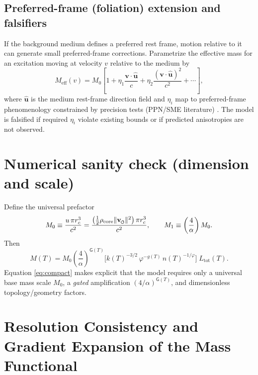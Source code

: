\documentclass[11pt]{article}
\newcommand{\vnorm}{\lVert \mathbf{v}_{\mkern-2mu\scriptscriptstyle\boldsymbol{\circlearrowleft}} \rVert}  %
\newcommand{\rc}{r_c}                                    %
\newcommand{\phig}{\varphi}
\newcommand{\alphafs}{\alpha}
\newcommand{\rhocore}{\rho_{\mathrm{core}}}
\newcommand{\Gate}{\mathsf{G}}                 %
\theoremstyle{definition}
\theoremstyle{plain}
\theoremstyle{remark}
\begin{document}
        \subsection{Preferred-frame (foliation) extension and falsifiers}
            If the background medium defines a preferred rest frame, motion relative to it can generate small preferred-frame corrections. Parametrize the effective mass for an excitation moving at velocity $v$ relative to the medium by
            \begin{equation}
                M_{\mathrm{eff}}(v)=M_0\left[1+\eta_1\frac{\mathbf{v}\cdot\hat{\mathbf{u}}}{c}
                                           +\eta_2\frac{(\mathbf{v}\cdot\hat{\mathbf{u}})^2}{c^2}+\cdots\right],
                \label{eq:pf}
            \end{equation}
            where $\hat{\mathbf{u}}$ is the medium rest-frame direction field and $\eta_i$ map to preferred-frame phenomenology constrained by precision tests (PPN/SME literature) \cite{Will2014,Kostelecky2004}. The model is falsified if required $\eta_i$ violate existing bounds or if predicted anisotropies are not observed.

        \section{Numerical sanity check (dimension and scale)}
        Define the universal prefactor
        \begin{equation}
            M_0 \equiv \frac{u\,\pi \rc^{3}}{c^{2}}
            =\frac{\left(\frac12\rhocore \vnorm^2\right)\pi \rc^3}{c^2},
            \qquad
            M_1 \equiv \left(\frac{4}{\alphafs}\right) M_0.
            \label{eq:M0}
        \end{equation}
        Then
        \begin{equation}
            M(T)= M_0 \left(\frac{4}{\alphafs}\right)^{\Gate(T)} \Big[k(T)^{-3/2}\,\phig^{-g(T)}\,n(T)^{-1/\phig}\Big]\;L_{\mathrm{tot}}(T).
            \label{eq:compact}
        \end{equation}
        Equation \eqref{eq:compact} makes explicit that the model requires only a universal base mass scale \(M_0\), a \emph{gated} amplification \((4/\alpha)^{\Gate(T)}\), and dimensionless topology/geometry factors.

    \section{Resolution Consistency and Gradient Expansion of the Mass Functional}
    \label{sec:resolution_consistency}
\end{document}

